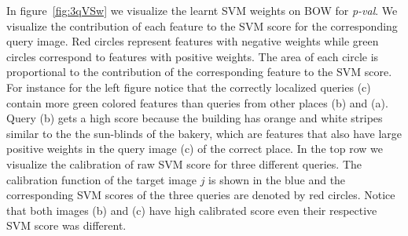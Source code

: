     In figure~\ref{fig:3qVSw} we visualize the learnt SVM weights on BOW for \emph{p-val}. We visualize the contribution of each feature to the SVM score for the corresponding query image. Red circles represent features with negative weights while green circles correspond to features with positive weights. The area of each circle is proportional to the contribution of the corresponding feature to the SVM score. For instance for the left figure notice that the correctly localized queries (c) contain more green colored features than queries from other places (b) and (a). Query (b) gets a high score because the building has orange and white stripes similar to the the sun-blinds of the bakery, which are features that also have large positive weights in the query image (c) of the correct place.
    In the top row we visualize the calibration of raw SVM score for three different queries. The calibration function of the target image $j$ is shown in the blue and the corresponding SVM scores of the three queries are denoted by red circles. Notice that both images (b) and (c) have high calibrated score even their respective SVM score was different.     
    
